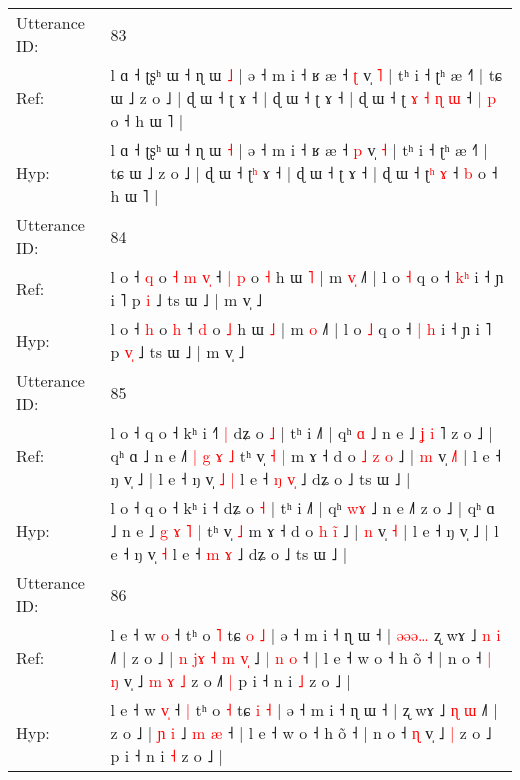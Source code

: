 \documentclass[10pt]{article}
\DeclareRobustCommand{\hl}[1]{{\textcolor{red}{#1}}}
\begin{document}
\begin{longtable}{ll}
 \\
\midrule
Utterance ID: & 83 \\
Ref: & l ɑ ˧ ʈʂʰ ɯ ˧ ɳ ɯ \hl{˩} | ə ˧ m i ˧ ʁ æ ˧ \hl{ʈ} v̩ \hl{˥} | tʰ i ˧ ʈʰ æ ˧˥ | tɕ ɯ ˩ z o ˩ | ɖ ɯ ˧ ʈ\hl{} ɤ ˧ | ɖ ɯ ˧ ʈ ɤ ˧ | ɖ ɯ ˧ ʈ\hl{ }\hl{ɤ}\hl{ }\hl{˧}\hl{ }\hl{ɳ} \hl{ɯ} ˧\hl{ }\hl{|} \hl{p} o ˧ h ɯ ˥ |
 \\
Hyp: & l ɑ ˧ ʈʂʰ ɯ ˧ ɳ ɯ \hl{˧} | ə ˧ m i ˧ ʁ æ ˧ \hl{p} v̩ \hl{˧} | tʰ i ˧ ʈʰ æ ˧˥ | tɕ ɯ ˩ z o ˩ | ɖ ɯ ˧ ʈ\hl{ʰ} ɤ ˧ | ɖ ɯ ˧ ʈ ɤ ˧ | ɖ ɯ ˧ ʈ\hl{}\hl{}\hl{}\hl{}\hl{}\hl{ʰ} \hl{ɤ} ˧\hl{}\hl{} \hl{b} o ˧ h ɯ ˥ |
 \\
\midrule
Utterance ID: & 84 \\
Ref: & l o ˧ \hl{q} o\hl{ }\hl{˧}\hl{ }\hl{m} \hl{v}\hl{̩} ˧\hl{ }\hl{|} \hl{p} o \hl{˧} h ɯ \hl{˥} | m \hl{v}\hl{̩} ˩˥ | l o \hl{˧} q o ˧ \hl{}\hl{k}\hl{ʰ} i ˧ ɲ i ˥ p \hl{}\hl{i} ˩ ts ɯ ˩ | m v̩ ˩
 \\
Hyp: & l o ˧ \hl{h} o\hl{}\hl{}\hl{}\hl{} \hl{}\hl{h} ˧\hl{}\hl{} \hl{d} o \hl{˩} h ɯ \hl{˩} | m \hl{}\hl{o} ˩˥ | l o \hl{˩} q o ˧ \hl{|}\hl{ }\hl{h} i ˧ ɲ i ˥ p \hl{v}\hl{̩} ˩ ts ɯ ˩ | m v̩ ˩
 \\
\midrule
Utterance ID: & 85 \\
Ref: & l o ˧ q o ˧ kʰ i ˧\hl{˥}\hl{ }\hl{|} dʑ o \hl{˩} | tʰ i ˩˥ | qʰ \hl{}\hl{ɑ} ˩ n e ˩\hl{ }\hl{ʝ}\hl{ }\hl{i}\hl{ }˥ z o ˩ | qʰ ɑ ˩ n e ˩\hl{˥} \hl{|} \hl{g} \hl{ɤ} \hl{˩} tʰ v̩\hl{ }\hl{˧} \hl{|} m ɤ ˧ d o \hl{˩} \hl{z}\hl{ }\hl{o} ˩ | \hl{m} v̩ \hl{˩}\hl{˥} | l e ˧ ŋ v̩ ˩ | l e ˧ ŋ v̩\hl{ }\hl{˩} \hl{|} l e ˧ \hl{ŋ} \hl{v}\hl{̩} ˩ dʑ o ˩ ts ɯ ˩ |
 \\
Hyp: & l o ˧ q o ˧ kʰ i ˧\hl{}\hl{}\hl{} dʑ o \hl{˧} | tʰ i ˩˥ | qʰ \hl{w}\hl{ɤ} ˩ n e ˩\hl{}\hl{}\hl{}\hl{}\hl{}˥ z o ˩ | qʰ ɑ ˩ n e ˩\hl{} \hl{g} \hl{ɤ} \hl{˥} \hl{|} tʰ v̩\hl{}\hl{} \hl{˩} m ɤ ˧ d o \hl{h} \hl{}\hl{i}\hl{̃} ˩ | \hl{n} v̩ \hl{}\hl{˧} | l e ˧ ŋ v̩ ˩ | l e ˧ ŋ v̩\hl{}\hl{} \hl{˧} l e ˧ \hl{m} \hl{}\hl{ɤ} ˩ dʑ o ˩ ts ɯ ˩ |
 \\
\midrule
Utterance ID: & 86 \\
Ref: & l e ˧ w \hl{}\hl{o} ˧\hl{}\hl{} tʰ o \hl{˥} tɕ \hl{o} \hl{˩} | ə ˧ m i ˧ ɳ ɯ ˧ |\hl{ }\hl{ə}\hl{ə}\hl{ə}\hl{…} ʐ wɤ ˩ \hl{n} \hl{i} ˩˥ | z o ˩ |\hl{ }\hl{n}\hl{ }\hl{j}\hl{ɤ}\hl{ }\hl{˧} \hl{m} \hl{v}\hl{̩} ˩\hl{ }\hl{|} \hl{n} \hl{o} ˧ | l e ˧ w o ˧ h õ ˧ | n o ˧\hl{ }\hl{|} \hl{ŋ} v̩ ˩\hl{ }\hl{m}\hl{ }\hl{ɤ} \hl{˩} z o ˩\hl{˥}\hl{ }\hl{|} p i ˧ n i \hl{˩} z o ˩ |
 \\
Hyp: & l e ˧ w \hl{v}\hl{̩} ˧\hl{ }\hl{|} tʰ o \hl{˧} tɕ \hl{i} \hl{˧} | ə ˧ m i ˧ ɳ ɯ ˧ |\hl{}\hl{}\hl{}\hl{}\hl{} ʐ wɤ ˩ \hl{ɳ} \hl{ɯ} ˩˥ | z o ˩ |\hl{}\hl{}\hl{}\hl{}\hl{}\hl{}\hl{} \hl{ɲ} \hl{}\hl{i} ˩\hl{}\hl{} \hl{m} \hl{æ} ˧ | l e ˧ w o ˧ h õ ˧ | n o ˧\hl{}\hl{} \hl{ɳ} v̩ ˩\hl{}\hl{}\hl{}\hl{} \hl{|} z o ˩\hl{}\hl{}\hl{} p i ˧ n i \hl{˧} z o ˩ |

\end{longtable}
\end{document}
